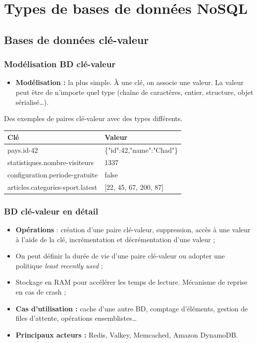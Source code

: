 \section{Types de bases de données NoSQL}

    \subsection{Bases de données clé-valeur}
    \begin{frame}
        \frametitle{Modélisation BD clé-valeur}

        \begin{itemize}
            \item \textbf{Modélisation :} la plus simple. À une clé, on associe une valeur. La valeur peut être de n'importe quel type (chaîne de caractères, entier, structure, objet sérialisé\dots).
        \end{itemize}

        \vspace{15px}
        Des exemples de paires clé-valeur avec des types différents.
        \vspace{5px}
        \begin{tabular}{|l|l|}
            \hline
            \textbf{Clé} & \textbf{Valeur} \\ \hline\hline
            pays.id-42 & \{"id":42,"name":"Chad"\} \\ \hline
            statistiques.nombre-visiteurs & 1337 \\ \hline
            configuration.periode-gratuite & false \\ \hline
            articles.categories-sport.latest & [22, 45, 67, 200, 87] \\ \hline
        \end{tabular}
    \end{frame}

    \begin{frame}
        \frametitle{BD clé-valeur en détail}
        \begin{itemize}
            \item \textbf{Opérations} : création d'une paire clé-valeur, suppression, accès à une valeur à l'aide de la clé, incrémentation et décrémentation d'une valeur ;
            \item On peut définir la durée de vie d'une paire clé-valeur ou adopter une politique \textit{least recently used} ;
            \item Stockage en RAM pour accélérer les temps de lecture. Mécanisme de reprise en cas de crash ;
            \item \textbf{Cas d'utilisation :} cache d'une autre BD, comptage d'éléments, gestion de files d'attente, opérations ensemblistes\dots
            \item \textbf{Principaux acteurs :} Redis, Valkey, Memcached, Amazon DynamoDB.
        \end{itemize}
    \end{frame}

